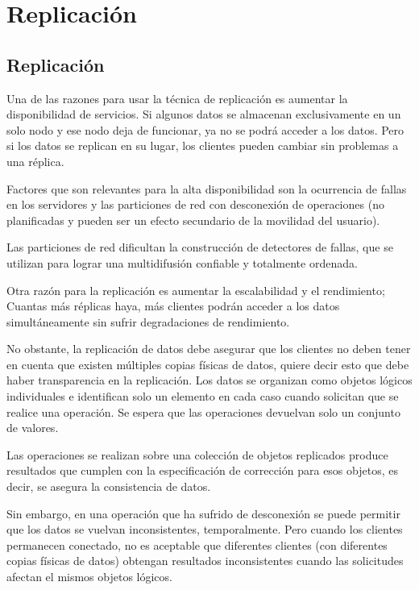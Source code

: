\setchapterpreamble[u]{\margintoc}

\chapter{Replicación}
\label{ch:Replicaci\'on}


\section{Replicaci\'on}

Una de las razones para usar la t\'ecnica de replicación es  aumentar la disponibilidad de servicios.
Si algunos datos se almacenan exclusivamente en un solo nodo y ese nodo deja de funcionar, ya no se podrá acceder a los datos. Pero si los datos se replican en su lugar, los clientes pueden cambiar sin problemas a una réplica.

 Factores que son relevantes para la alta disponibilidad  son la ocurrencia de fallas en los  servidores y las particiones de red con  desconexi\'on de operaciones  (no planificadas y pueden ser un efecto secundario de la movilidad del usuario).
 
 Las particiones de red dificultan la construcción de detectores de fallas,
 que se utilizan para lograr una multidifusión confiable y totalmente ordenada.
  

 Otra razón para la replicación es aumentar la escalabilidad y el rendimiento; Cuantas más réplicas haya, más clientes podrán acceder a los datos simultáneamente sin sufrir degradaciones de rendimiento. 
     

No obstante, la replicaci\'on de datos debe asegurar que   los clientes  no deben tener en cuenta que existen múltiples copias físicas de datos, quiere decir esto que debe haber  transparencia en la replicación. 
Los datos se organizan como objetos lógicos individuales e identifican solo un elemento en cada caso cuando solicitan que se realice una operación. Se 
 espera que las operaciones devuelvan solo un conjunto de valores. 

Las operaciones se realizan sobre una colección de objetos replicados produce resultados que cumplen con la especificación de corrección para esos objetos, es decir, se asegura la  consistencia de datos.

Sin embargo, en una  operación que ha sufrido de desconexi\'on se puede permitir que los datos se vuelvan inconsistentes, temporalmente. Pero cuando los clientes permanecen conectado,  no es aceptable que diferentes clientes (con diferentes copias físicas de datos) obtengan resultados inconsistentes cuando las solicitudes afectan  el mismos objetos lógicos.  
 
